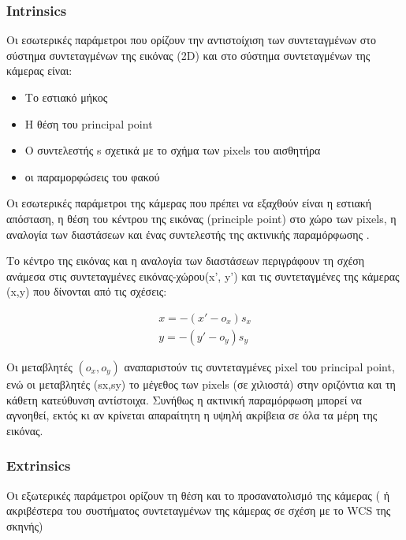 \subsubsection{Intrinsics}

Οι εσωτερικές παράμετροι που ορίζουν την αντιστοίχιση των συντεταγμένων στο σύστημα συντεταγμένων της εικόνας (2D) και στο σύστημα συντεταγμένων της κάμερας είναι:

\begin{itemize}
\item Το εστιακό μήκος
\item Η θέση του principal point
\item Ο συντελεστής s σχετικά με το σχήμα των pixels του αισθητήρα
\item οι παραμορφώσεις του φακού
\end{itemize}





Οι εσωτερικές παράμετροι της κάμερας που πρέπει να εξαχθούν είναι η εστιακή απόσταση, η θέση του κέντρου της εικόνας (principle point) στο χώρο των pixels, η αναλογία των διαστάσεων και ένας συντελεστής της ακτινικής παραμόρφωσης \cite{Malik2002}. 



Το κέντρο της εικόνας και η αναλογία των διαστάσεων περιγράφουν τη σχέση ανάμεσα στις συντεταγμένες εικόνας-χώρου(x', y') και τις συντεταγμένες της κάμερας (x,y) που δίνονται από τις σχέσεις:

\begin{equation}
\begin{aligned}
x=-(x'-o_{x})s_{x}
\\
y=-(y'-o_{y})s_{y}
\end{aligned}
\end{equation}

Οι μεταβλητές $(o_{x},o_{y})$ αναπαριστούν τις συντεταγμένες pixel του principal point, ενώ οι μεταβλητές (sx,sy) το μέγεθος των pixels (σε χιλιοστά) στην οριζόντια και τη κάθετη κατεύθυνση αντίστοιχα.
Συνήθως η ακτινική παραμόρφωση μπορεί να αγνοηθεί, εκτός κι αν κρίνεται απαραίτητη η υψηλή ακρίβεια σε όλα τα μέρη της εικόνας. 


\subsubsection{Extrinsics}

Οι εξωτερικές παράμετροι ορίζουν τη θέση και το προσανατολισμό της κάμερας ( ή ακριβέστερα του συστήματος συντεταγμένων της κάμερας σε σχέση με το WCS της σκηνής)


